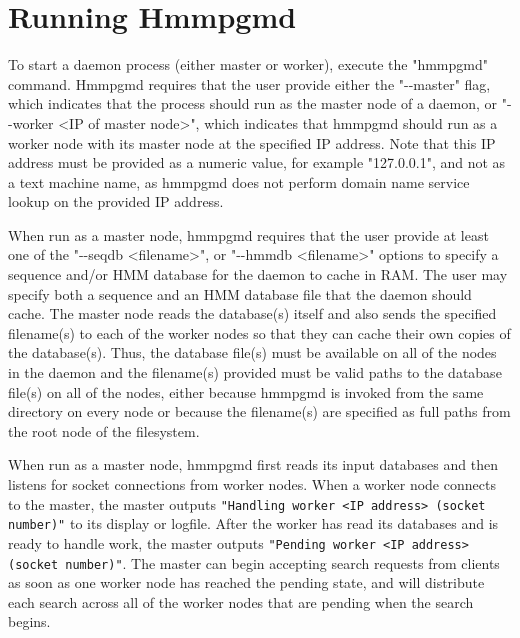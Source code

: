 \documentclass[notoc,justified]{tufte-book}    %
\begin{document}
\section{Running Hmmpgmd}
To start a daemon process (either master or worker), execute the "hmmpgmd" command.  Hmmpgmd requires that the user provide either the "-{}-master" flag, which indicates that the process should run as the master node of a daemon, or "-{}-worker <IP of master node>", which indicates that hmmpgmd should run as a worker node with its master node at the specified IP address.  Note that this IP address must be provided as a numeric value, for example "127.0.0.1", and not as a text machine name, as hmmpgmd does not perform domain name service lookup on the provided IP address.  

When run as a master node, hmmpgmd requires that the user provide at least one of the "-{}-seqdb <filename>", or "-{}-hmmdb <filename>" options to specify a sequence and/or HMM database for the daemon to cache in RAM.  The user may specify both a sequence and an HMM database file that the daemon should cache.  The master node reads the database(s) itself and also sends the specified filename(s) to each of the worker nodes so that they can cache their own copies of the database(s).  Thus, the database file(s) must be available on all of the nodes in the daemon and the filename(s) provided must be valid paths to the database file(s) on all of the nodes, either because hmmpgmd is invoked from the same directory on every node or because the filename(s) are specified as full paths from the root node of the filesystem.

When run as a master node, hmmpgmd first reads its input databases and then listens for socket connections from worker nodes.  When a worker node connects to the master, the master outputs {\tt "Handling worker <IP address> (socket number)"} to its display or logfile.  After the worker has read its databases and is ready to handle work, the master outputs {\tt "Pending worker <IP address> (socket number)"}.  The master can begin accepting search requests from clients as soon as one worker node has reached the pending state, and will distribute each search across all of the worker nodes that are pending when the search begins.
\end{document}
